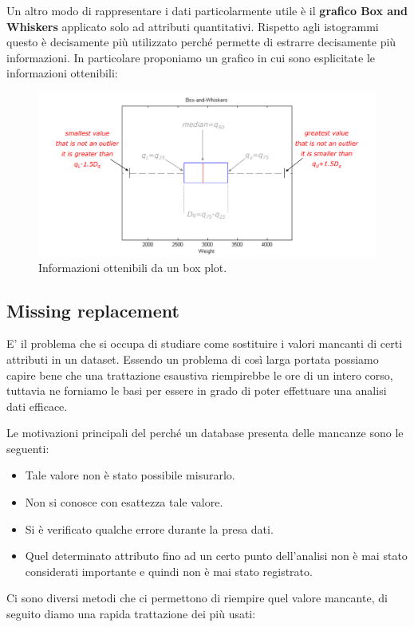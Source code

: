 Un altro modo di rappresentare i dati particolarmente utile è il \textbf{grafico Box and Whiskers} applicato solo ad attributi quantitativi. Rispetto agli istogrammi questo è decisamente più utilizzato perché permette di estrarre decisamente più informazioni. In particolare proponiamo un grafico in cui sono esplicitate le informazioni ottenibili:

\begin{figure}[H]
	\centering
	\includegraphics[height=0.4 \linewidth]{introduction/pict/box_plot.png}
	\caption{Informazioni ottenibili da un box plot.}
\end{figure}


\subsection{Missing replacement}

E' il problema che si occupa di studiare come sostituire i valori mancanti di certi attributi  in un dataset. Essendo un problema di così larga portata possiamo capire bene che una trattazione esaustiva riempirebbe le ore di un intero corso, tuttavia ne forniamo le basi per essere in grado di poter effettuare una analisi dati efficace. 

Le motivazioni principali del perché un database presenta delle mancanze sono le seguenti:
\begin{itemize}
	\item Tale valore non è stato possibile misurarlo.
	\item Non si conosce con esattezza tale valore.
	\item Si è verificato qualche errore durante la presa dati.
	\item Quel determinato attributo fino ad un certo punto dell'analisi non è mai stato considerati importante e quindi non è mai stato registrato.
\end{itemize}

Ci sono diversi metodi che ci permettono di riempire quel valore mancante, di seguito diamo una rapida trattazione dei più usati:

